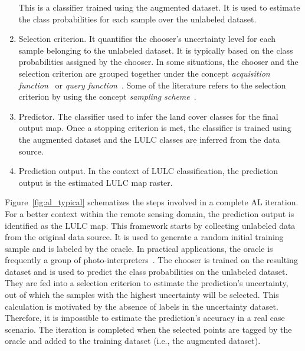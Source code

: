 \documentclass[parskip=full]{scrartcl}
\begin{document}
\begin{enumerate}
        This is a classifier trained using the augmented dataset. It is used to
        estimate the class probabilities for each sample over the unlabeled
        dataset.
    \item Selection criterion. It quantifies the chooser's uncertainty level for
        each sample belonging to the unlabeled dataset. It is typically based on
        the class probabilities assigned by the chooser. In some situations, the
        chooser and the selection criterion are grouped together under the
        concept \textit{acquisition function}~\cite{Ruzicka2020} or
        \textit{query function}~\cite{Su2020}. Some of the literature refers to
        the selection criterion by using the concept \textit{sampling
        scheme}~\cite{Liu2020}.
    \item Predictor. The classifier used to infer the land cover classes for the
        final output map.  Once a stopping criterion is met, the classifier is
        trained using the augmented dataset and the LULC classes are inferred
        from the data source.
    \item Prediction output. In the context of LULC classification, the
        prediction output is the estimated LULC map raster.
\end{enumerate}

Figure~\ref{fig:al_typical} schematizes the steps involved in a complete AL
iteration. For a better context within the remote sensing domain, the prediction
output is identified as the LULC map. This framework starts by collecting
unlabeled data from the original data source. It is used to generate a random
initial training sample and is labeled by the oracle. In practical applications,
the oracle is frequently a group of photo-interpreters~\cite{Kottke2017}. The
chooser is trained on the resulting dataset and is used to predict the class
probabilities on the unlabeled dataset. They are fed into a selection criterion
to estimate the prediction's uncertainty, out of which the samples with the
highest uncertainty will be selected. This calculation is motivated by the
absence of labels in the uncertainty dataset. Therefore, it is impossible to
estimate the prediction's accuracy in a real case scenario. The iteration is
completed when the selected points are tagged by the oracle and added to the
training dataset (i.e., the augmented dataset). 
\end{document}
